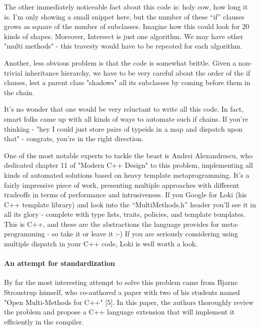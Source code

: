 \documentclass{book}
\begin{document}
The other immediately noticeable fact about this code is: holy cow, how long it is.
I'm only showing a small snippet here, but the number of these ``if'' clauses grows as square of the number of subclasses.
Imagine how this could look for 20 kinds of shapes. Moreover, Intersect is just one algorithm. We may have other "multi methods" - this travesty would have to be repeated for each algorithm.

Another, less obvious problem is that the code is somewhat brittle. Given a non-trivial inheritance hierarchy,
we have to be very careful about the order of the if clauses, lest a parent class "shadows" all its subclasses by coming before them in the chain.

It's no wonder that one would be very reluctant to write all this code. In fact, smart folks came up with all kinds of ways to automate such if chains.
If you're thinking - "hey I could just store pairs of typeids in a map and dispatch upon that" - congrats, you're in the right direction.

One of the most notable experts to tackle the beast is Andrei Alexandrescu, who dedicated chapter 11 of "Modern C++ Design" to this problem,
implementing all kinds of automated solutions based on heavy template metaprogramming. It's a fairly impressive piece of work,
presenting multiple approaches with different tradeoffs in terms of performance and intrusiveness.
If you Google for Loki (his C++ template library) and look into the ``MultiMethods.h'' header you'll see it in all its glory - complete with type lists, traits, policies, and template templates.
This is C++, and these are the abstractions the language provides for meta-programming - so take it or leave it :-)
If you are seriously considering using multiple dispatch in your C++ code, Loki is well worth a look.
\paragraph{An attempt for standardization}

By far the most interesting attempt to solve this problem came from Bjarne Stroustrup himself, who co-authored a paper with two of his students named "Open Multi-Methods for C++" [5].
In this paper, the authors thoroughly review the problem and propose a C++ language extension that will implement it efficiently in the compiler.
\end{document}
